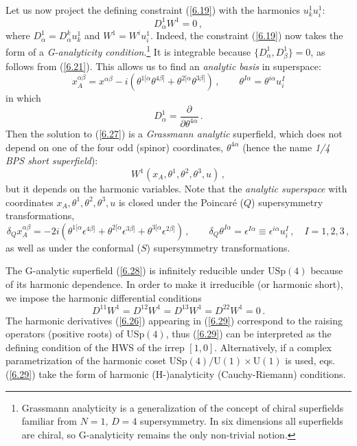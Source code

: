 \documentclass[a4paper,11pt]{article}
\begin{document}
Let us now project the defining constraint (\ref{6.19}) with the harmonics
$u^1_k u^1_{i}$:
\begin{equation}\label{6.27}
D^1_\alpha W^{1} = 0 \, ,
\end{equation}
where $D^{1}_\alpha = D^k_\alpha u^{1}_k$ and
$W^{1}=W^{i}u^1_{i}$. Indeed, the constraint (\ref{6.19}) now
takes the form of a {\it G-analyticity
condition}.\footnote{Grassmann analyticity \cite{GIO} is a
generalization of the concept of chiral superfields familiar from
$N=1, \, D=4$ supersymmetry. In six dimensions all superfields are
chiral, so G-analyticity remains the only non-trivial notion.} It
is integrable because $\{D^1_\alpha, D^1_\beta\} = 0$, as follows
from (\ref{6.21}). This allows us to find an {\it analytic basis}
in superspace:
\begin{equation}\label{AB}
  x^{\alpha\beta}_A  = x^{\alpha\beta} - i\left(\theta^{1[\alpha} \theta^{4\beta]}
  +  \theta^{2[\alpha} \theta^{3\beta]} \right)\,, \qquad \theta^{I\alpha} =
  \theta^{i\alpha}u^I_i
\end{equation}
in which
\begin{equation}\label{6.210}
  D^1_\alpha =  \frac{\partial}{\partial\theta^{4\alpha}}\,.
\end{equation}
Then the solution to (\ref{6.27}) is a {\it Grassmann analytic} superfield,
which does not depend on one of the four odd (spinor) coordinates,
$\theta^{4\alpha}$ (hence the name {\it 1/4 BPS short superfield}):
\begin{equation}\label{6.28}
W^{1}(x_A,\theta^1,\theta^2,\theta^{3},u)\,,
\end{equation}
but it depends on the harmonic variables. Note that the {\it analytic
superspace} with coordinates $x_A,\theta^1,\theta^2,\theta^{3},u$  is closed
under the Poincar\'e ($Q$) supersymmetry transformations,
\begin{equation}\label{Qsusy}
  \delta_Q  x^{\alpha\beta}_A  =  -2i(\theta^{1[\alpha}
  \epsilon^{4\beta]} + \theta^{2[\alpha}
  \epsilon^{3\beta]}  + \theta^{3[\alpha}
  \epsilon^{2\beta]})\,, \qquad  \delta_Q  \theta^{I\alpha} = \epsilon^{I\alpha}
  \equiv  \epsilon^{i\alpha}u^I_i\,, \quad I=1,2,3     \,,
\end{equation}
as well as under the conformal ($S$) supersymmetry transformations.

The G-analytic superfield (\ref{6.28}) is infinitely reducible under
$\mbox{USp}(4)$ because of its harmonic dependence. In order to make it
irreducible (or harmonic short), we impose the harmonic differential conditions
\begin{equation}\label{6.29}
   D^{11}W^{1} = D^{12}W^{1} = D^{13}W^{1} = D^{22}W^{1} = 0\,.
\end{equation}
The harmonic derivatives (\ref{6.26}) appearing in (\ref{6.29})
correspond to the raising operators (positive roots) of
$\mbox{USp}(4)$, thus (\ref{6.29}) can be interpreted as the
defining condition of the HWS of the irrep $[1,0]$. Alternatively,
if a complex parametrization of the harmonic coset
${\mbox{USp}}(4)/\mbox{U}(1)\times \mbox{U}(1)$ is used, eqs.
(\ref{6.29}) take the form of harmonic (H-)analyticity
(Cauchy-Riemann) conditions.
\end{document}
